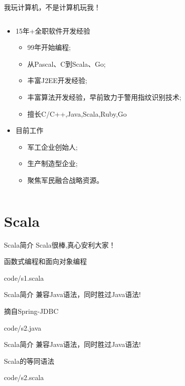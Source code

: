 \documentclass[10pt,aspectratio=43,mathserif,table]{beamer}
\begin{document}
\begin{frame}{我玩计算机，不是计算机玩我！}
\begin{columns}[T]
\begin{column}
\begin{itemize}
    \item<1-> 15年+全职软件开发经验
          \begin{itemize}
            \item<1-> 99年开始编程;
            \item<1-> 从Pascal、C到Scala、Go;
            \item<1-> 丰富J2EE开发经验;
            \item<1-> 丰富算法开发经验，早前致力于警用指纹识别技术;
            \item<1-> 擅长C/C++,Java,Scala,Ruby,Go
          \end{itemize}
    \item<2-> 目前工作
          \begin{itemize}
            \item<2-> 军工企业创始人;
            \item<2-> 生产制造型企业;
            \item<2-> 聚焦军民融合战略资源。
          \end{itemize}
  \end{itemize}
\end{column}%
\end{columns}
\end{frame}


\section{Scala}  %

\begin{frame}{Scala简介}
  Scala很棒,真心安利大家！
\begin{block}{函数式编程和面向对象编程}
  
  {code/s1.scala}
\end{block}
\end{frame}

\begin{frame}{Scala简介}
  兼容Java语法，同时胜过Java语法!
\begin{block}{摘自Spring-JDBC}
  
  {code/s2.java}
\end{block}
\end{frame}
\begin{frame}{Scala简介}
  兼容Java语法，同时胜过Java语法!
\begin{block}{Scala的等同语法}
  
  {code/s2.scala}
\end{block}
\end{frame}
\end{document}
